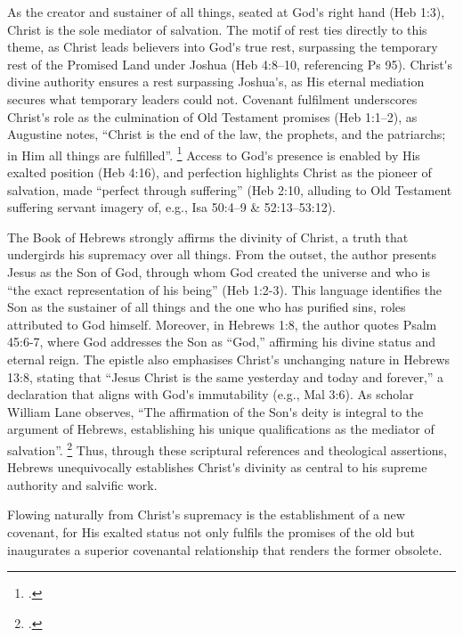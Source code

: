 \documentclass[12pt]{article}
\def\apos{^^27}         %
\def\jesus{Yeshua}
\def\christ{the Messiah}
\def\Christ{The Messiah}
\def\jesus{Jesus}
\def\christ{Christ}
\def\Christ{Christ}
\begin{document}
As the creator and sustainer of all things, seated at God\apos{}s right hand
(Heb 1:3), \christ{} is the sole mediator of salvation.
%
The motif of rest ties directly to this theme, as \christ{} leads believers into
God\apos{}s true rest, surpassing the temporary rest of the Promised Land under
Joshua (Heb 4:8--10, referencing Ps 95).
%
\Christ{}\apos{}s divine authority ensures a rest surpassing Joshua\apos{}s, as
His eternal mediation secures what temporary leaders could not.  Covenant
fulfilment underscores \christ{}\apos{}s role as the culmination of Old
Testament promises (Heb 1:1--2), as Augustine notes, ``Christ is the end of the
law, the prophets, and the patriarchs; in Him all things are fulfilled''.
\footcite[14.24]{Augustine1887} Access to God\apos{}s presence is enabled by His
exalted position (Heb 4:16), and perfection highlights \christ{} as the pioneer
of salvation, made ``perfect through suffering'' (Heb 2:10, alluding to Old
Testament suffering servant imagery of, e.g., Isa 50:4--9 \& 52:13--53:12).

The Book of Hebrews strongly affirms the divinity of \christ{}, a truth that
undergirds his supremacy over all things. From the outset, the author presents
\jesus{} as the Son of God, through whom God created the universe and who is
``the exact representation of his being'' (Heb 1:2-3).
%
This language identifies the Son as the sustainer of all things and the one who
has purified sins, roles attributed to God himself. Moreover, in Hebrews 1:8,
the author quotes Psalm 45:6-7, where God addresses the Son as ``God,''
affirming his divine status and eternal reign.
%
The epistle also emphasises \christ{}\apos{}s unchanging nature in Hebrews 13:8,
stating that ``\jesus{} \christ{} is the same yesterday and today and forever,''
a declaration that aligns with God\apos{}s immutability (e.g., Mal 3:6). As
scholar William Lane observes, ``The affirmation of the Son\apos{}s deity is
integral to the argument of Hebrews, establishing his unique qualifications as
the mediator of salvation''. \footcite[15]{Lane1991}
%
Thus, through these scriptural references and theological assertions, Hebrews
unequivocally establishes \christ{}\apos{}s divinity as central to his supreme
authority and salvific work.

Flowing naturally from \christ{}\apos{}s supremacy is the establishment of a new
covenant, for His exalted status not only fulfils the promises of the old but
inaugurates a superior covenantal relationship that renders the former obsolete.
\end{document}
